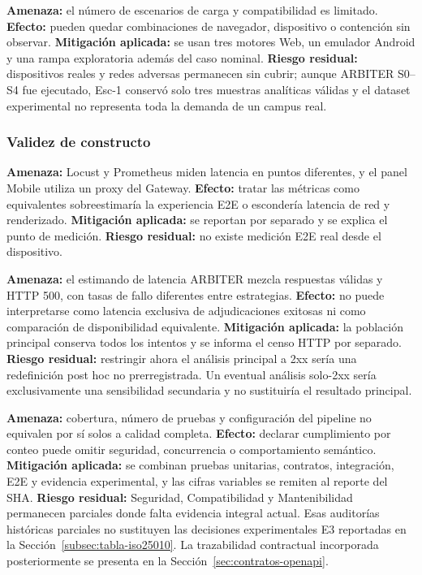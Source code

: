 \textbf{Amenaza:} el número de escenarios de carga y compatibilidad es limitado.
\textbf{Efecto:} pueden quedar combinaciones de navegador, dispositivo o
contención sin observar. \textbf{Mitigación aplicada:} se usan tres motores Web,
un emulador Android y una rampa exploratoria además del caso nominal.
\textbf{Riesgo residual:} dispositivos reales y redes adversas permanecen sin
cubrir; aunque ARBITER S0--S4 fue ejecutado, Esc-1 conservó solo tres muestras
analíticas válidas y el dataset experimental no representa toda la demanda de
un campus real.

\subsubsection{Validez de constructo}

\textbf{Amenaza:} Locust y Prometheus miden latencia en puntos diferentes, y el
panel Mobile utiliza un proxy del Gateway. \textbf{Efecto:} tratar las métricas
como equivalentes sobreestimaría la experiencia E2E o escondería latencia de
red y renderizado. \textbf{Mitigación aplicada:} se reportan por separado y se
explica el punto de medición. \textbf{Riesgo residual:} no existe medición E2E
real desde el dispositivo.

\textbf{Amenaza:} el estimando de latencia ARBITER mezcla respuestas válidas y
HTTP 500, con tasas de fallo diferentes entre estrategias. \textbf{Efecto:} no
puede interpretarse como latencia exclusiva de adjudicaciones exitosas ni como
comparación de disponibilidad equivalente. \textbf{Mitigación aplicada:} la
población principal conserva todos los intentos y se informa el censo HTTP por
separado. \textbf{Riesgo residual:} restringir ahora el análisis principal a
2xx sería una redefinición post hoc no prerregistrada. Un eventual análisis
solo-2xx sería exclusivamente una sensibilidad secundaria y no sustituiría el
resultado principal.

\textbf{Amenaza:} cobertura, número de pruebas y configuración del pipeline no
equivalen por sí solos a calidad completa. \textbf{Efecto:} declarar
cumplimiento por conteo puede omitir seguridad, concurrencia o comportamiento
semántico. \textbf{Mitigación aplicada:} se combinan pruebas unitarias,
contratos, integración, E2E y evidencia experimental, y las cifras variables se
remiten al reporte del SHA. \textbf{Riesgo residual:} Seguridad,
Compatibilidad y Mantenibilidad permanecen parciales donde falta evidencia
integral actual. Esas auditorías históricas parciales no sustituyen las
decisiones experimentales E3 reportadas en la
Sección~\ref{subsec:tabla-iso25010}. La trazabilidad contractual incorporada
posteriormente se presenta en la Sección~\ref{sec:contratos-openapi}.

